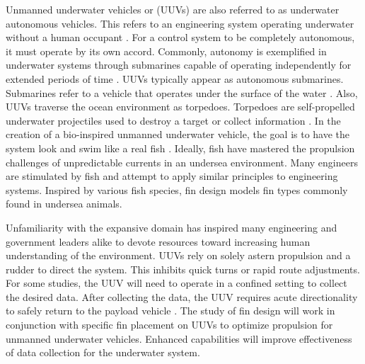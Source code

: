 \documentclass[]{IEEEtran}
\begin{document}
Unmanned underwater vehicles or (UUVs) are also referred to as underwater autonomous vehicles.  This refers to an engineering system operating underwater without a human occupant \cite{greenemeier2011bloom}.  For a control system to be completely autonomous, it must operate by its own accord.  Commonly, autonomy is exemplified in underwater systems through submarines capable of operating independently for extended periods of time \cite{davenport2016drone}.  UUVs typically appear as autonomous submarines.  Submarines refer to a vehicle that operates under the surface of the water \cite{davenport2016drone}.  Also, UUVs traverse the ocean environment as torpedoes.  Torpedoes are self-propelled underwater projectiles used to destroy a target or collect information \cite{greenemeier2011bloom}.  In the creation of a bio-inspired unmanned underwater vehicle, the goal is to have the system look and swim like a real fish \cite{frizell2014navy}.  Ideally, fish have mastered the propulsion challenges of unpredictable currents in an undersea environment.  Many engineers are stimulated by fish and attempt to apply similar principles to engineering systems.  Inspired by various fish species, fin design models fin types commonly found in undersea animals.  

Unfamiliarity with the expansive domain has inspired many engineering and government leaders alike to devote resources toward increasing human understanding of the environment.  UUVs rely on solely astern propulsion and a rudder to direct the system.  This inhibits quick turns or rapid route adjustments.  For some studies, the UUV will need to operate in a confined setting to collect the desired data.  After collecting the data, the UUV requires acute directionality to safely return to the payload vehicle \cite{davenport2016drone}.  The study of fin design will work in conjunction with specific fin placement on UUVs to optimize propulsion for unmanned underwater vehicles.  Enhanced capabilities will improve effectiveness of data collection for the underwater system.  
   
\end{document}
